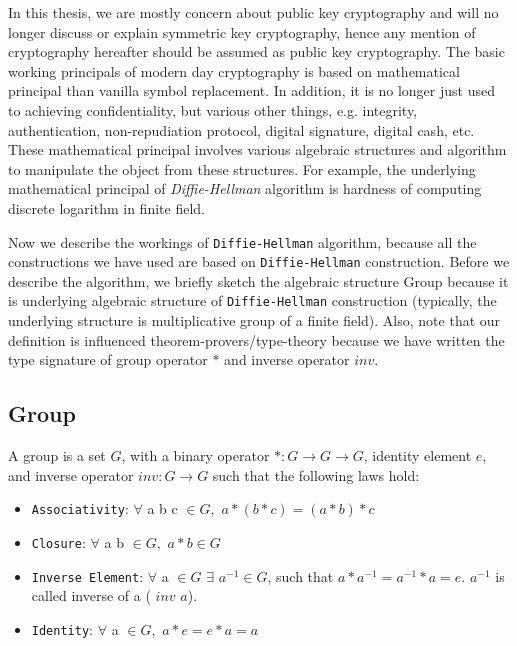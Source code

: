     
    
    In this thesis, we are mostly concern about public key cryptography and will no longer discuss or explain 
    symmetric key cryptography, hence any mention of cryptography hereafter should be assumed as
    public key cryptography. 
    The basic working principals of modern day cryptography is based on 
    mathematical principal than vanilla symbol replacement. 
    In addition, it is no longer just 
    used to achieving confidentiality, but various other things, e.g. integrity,  authentication, non-repudiation 
    protocol, digital signature, digital cash, etc.
    These mathematical principal involves 
    various algebraic structures and algorithm to manipulate the object from these structures.
    For example, the underlying mathematical principal of \textit{Diffie-Hellman}  algorithm 
    is hardness of computing discrete logarithm in finite field.
    
    
  
    
    Now we  describe the workings of \texttt{Diffie-Hellman} \citep{Diffie:2006:NDC:2263321.2269104}
    algorithm, because all the constructions we have used  are based on \texttt{Diffie-Hellman} construction. 
    Before we describe the algorithm, we briefly sketch the algebraic structure Group because it is underlying algebraic structure of 
    \texttt{Diffie-Hellman}  construction  (typically, the underlying 
    structure is multiplicative group of a finite field). Also, note that our definition is influenced theorem-provers/type-theory because 
    we have  written the type signature of group operator $*$ and inverse operator $inv$. 
    
    \subsection{Group}
    \label{sec:group}
    A group is a set $G$, with a binary operator $* : G \rightarrow G \rightarrow G$, identity element $e$, and inverse operator $inv : G \rightarrow G$ such 
    that the following laws hold: 
    \begin{itemize}
     \item \texttt{Associativity}: $\forall$  a b c $\in G,$  $a * (b * c) = (a * b) * c$
    \item \texttt{Closure}: $\forall$ a b $\in G,$  $a * b \in G$
    \item \texttt{Inverse Element}: $\forall$ a $\in G$ $\exists$ $a^{-1} \in G$, such that $a * a^{-1} = a^{-1} * a = e$. $a^{-1}$ is called inverse of a (
     $inv$ $a$).
    \item \texttt{Identity}: $\forall$ a $\in G,$  $a * e = e * a  = a$
    \end{itemize}
   
